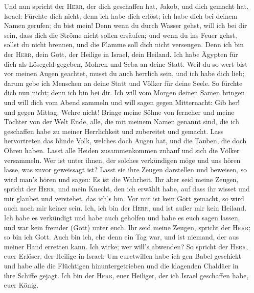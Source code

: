  Und nun spricht der \textsc{Herr}, der dich geschaffen
hat, Jakob, und dich gemacht hat, Israel: Fürchte dich nicht, denn ich
habe dich erlöst; ich habe dich bei deinem Namen gerufen; du bist mein!
 Denn wenn du durch Wasser gehst, will ich bei dir sein,
dass dich die Ströme nicht sollen ersäufen; und wenn du ins Feuer gehst,
sollst du nicht brennen, und die Flamme soll dich nicht versengen.
 Denn ich bin der \textsc{Herr}, dein Gott, der Heilige in
Israel, dein Heiland. Ich habe Ägypten für dich als Lösegeld gegeben,
Mohren und Seba an deine Statt.  Weil du so wert bist vor
meinen Augen geachtet, musst du auch herrlich sein, und ich habe dich
lieb; darum gebe ich Menschen an deine Statt und Völker für deine Seele.
 So fürchte dich nun nicht; denn ich bin bei dir. Ich will
vom Morgen deinen Samen bringen und will dich vom Abend sammeln
 und will sagen gegen Mitternacht: Gib her! und gegen
Mittag: Wehre nicht! Bringe meine Söhne von ferneher und meine Töchter
von der Welt Ende,  alle, die mit meinem Namen genannt
sind, die ich geschaffen habe zu meiner Herrlichkeit und zubereitet und
gemacht.  Lass hervortreten das blinde Volk, welches doch
Augen hat, und die Tauben, die doch Ohren haben.  Lasst
alle Heiden zusammenkommen zuhauf und sich die Völker versammeln. Wer
ist unter ihnen, der solches verkündigen möge und uns hören lasse, was
zuvor geweissagt ist? Lasst sie ihre Zeugen darstellen und beweisen, so
wird man's hören und sagen: Es ist die Wahrheit.  Ihr
aber seid meine Zeugen, spricht der \textsc{Herr}, und mein Knecht, den
ich erwählt habe, auf dass ihr wisset und mir glaubet und verstehet, das
ich's bin. Vor mir ist kein Gott gemacht, so wird auch nach mir keiner
sein.  Ich, ich bin der \textsc{Herr}, und ist außer mir
kein Heiland.  Ich habe es verkündigt und habe auch
geholfen und habe es euch sagen lassen, und war kein fremder (Gott)
unter euch. Ihr seid meine Zeugen, spricht der \textsc{Herr}; so bin ich
Gott.  Auch bin ich, ehe denn ein Tag war, und ist
niemand, der aus meiner Hand erretten kann. Ich wirke; wer will's
abwenden?  So spricht der \textsc{Herr}, euer Erlöser,
der Heilige in Israel: Um euretwillen habe ich gen Babel geschickt und
habe alle die Flüchtigen hinuntergetrieben und die klagenden Chaldäer in
ihre Schiffe gejagt.  Ich bin der \textsc{Herr}, euer
Heiliger, der ich Israel geschaffen habe, euer König.

